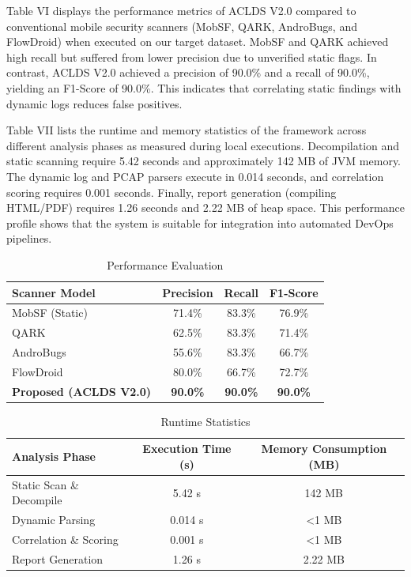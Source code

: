 \documentclass[conference]{
IEEEtran}
\begin{document}
Table VI displays the performance metrics of ACLDS V2.0 compared to conventional mobile security scanners (MobSF, QARK, AndroBugs, and FlowDroid) when executed on our target dataset. MobSF and QARK achieved high recall but suffered from lower precision due to unverified static flags. In contrast, ACLDS V2.0 achieved a precision of 90.0\% and a recall of 90.0\%, yielding an F1-Score of 90.0\%. This indicates that correlating static findings with dynamic logs reduces false positives.

Table VII lists the runtime and memory statistics of the framework across different analysis phases as measured during local executions. Decompilation and static scanning require 5.42 seconds and approximately 142 MB of JVM memory. The dynamic log and PCAP parsers execute in 0.014 seconds, and correlation scoring requires 0.001 seconds. Finally, report generation (compiling HTML/PDF) requires 1.26 seconds and 2.22 MB of heap space. This performance profile shows that the system is suitable for integration into automated DevOps pipelines.

\begin{table}[h]
\caption{Performance Evaluation}
\centering
\begin{tabular}{lccc}
\toprule
\textbf{Scanner Model} & \textbf{Precision} & \textbf{Recall} & \textbf{F1-Score} \\
\midrule
MobSF (Static) & 71.4\% & 83.3\% & 76.9\% \\
QARK & 62.5\% & 83.3\% & 71.4\% \\
AndroBugs & 55.6\% & 83.3\% & 66.7\% \\
FlowDroid & 80.0\% & 66.7\% & 72.7\% \\
\textbf{Proposed (ACLDS V2.0)} & \textbf{90.0\%} & \textbf{90.0\%} & \textbf{90.0\%} \\
\bottomrule
\end{tabular}
\end{table}

\begin{table}[h]
\caption{Runtime Statistics}
\centering
\begin{tabular}{lcc}
\toprule
\textbf{Analysis Phase} & \textbf{Execution Time (s)} & \textbf{Memory Consumption (MB)} \\
\midrule
Static Scan \& Decompile & 5.42 s & 142 MB \\
Dynamic Parsing & 0.014 s & <1 MB \\
Correlation \& Scoring & 0.001 s & <1 MB \\
Report Generation & 1.26 s & 2.22 MB \\
\bottomrule
\end{tabular}
\end{table}
\end{document}
